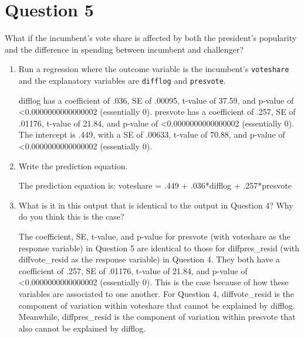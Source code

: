\documentclass[12pt,letterpaper]{article}
\begin{document}
\section*{Question 5}%
\noindent What if the incumbent's vote share is affected by both the president's popularity and the difference in spending between incumbent and challenger? 
	\begin{enumerate}
		\item Run a regression where the outcome variable is the incumbent's \texttt{voteshare} and the explanatory variables are \texttt{difflog} and \texttt{presvote}.	
				\vspace{.5cm}
	
				\vspace{.25cm}
difflog has a coefficient of .036, SE of .00095, t-value of 37.59, and p-value of \textless0.0000000000000002 (essentially 0).
presvote has a coefficient of .257, SE of .01176, t-value of 21.84, and p-value of \textless0.0000000000000002 (essentially 0).
The intercept is .449, with a SE of .00633, t-value of 70.88, and p-value of \textless0.0000000000000002 (essentially 0).
				\vspace{1cm}
		\item Write the prediction equation.
				\vspace{.5cm}
	
				\vspace{.25cm}
The prediction equation is: voteshare = .449 + .036*difflog + .257*presvote
				\vspace{1cm}
		\item What is it in this output that is identical to the output in Question 4? Why do you think this is the case?
				\vspace{.5cm}
				
The coefficient, SE, t-value, and p-value for presvote (with voteshare as the response variable) in Question 5 are identical to those for diffpres\_resid (with diffvote\_resid as the response variable) in Question 4. They both have a coefficient of .257, SE of .01176, t-value of 21.84, and p-value of \textless0.0000000000000002 (essentially 0). This is the case because of how these variables are associated to one another. For Question 4, diffvote\_resid is the component of variation within voteshare that cannot be explained by difflog. Meanwhile, diffpres\_resid is the component of variation within presvote that also cannot be explained by difflog. 


\end{enumerate}
\end{document}

